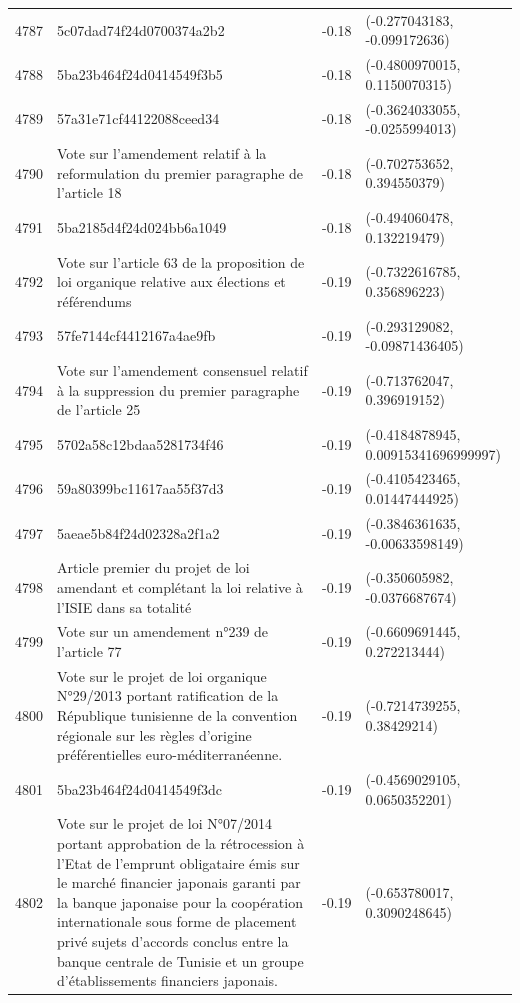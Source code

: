 \begin{table}[ht]
\begin{tabular}{rlrl}
  4787 & 5c07dad74f24d0700374a2b2 & -0.18 & (-0.277043183, -0.099172636) \\ 
  4788 & 5ba23b464f24d0414549f3b5 & -0.18 & (-0.4800970015, 0.1150070315) \\ 
  4789 & 57a31e71cf44122088ceed34 & -0.18 & (-0.3624033055, -0.0255994013) \\ 
  4790 & Vote sur l'amendement relatif à la reformulation du premier paragraphe de l'article 18 & -0.18 & (-0.702753652, 0.394550379) \\ 
  4791 & 5ba2185d4f24d024bb6a1049 & -0.18 & (-0.494060478, 0.132219479) \\ 
  4792 & Vote sur l'article 63 de la proposition de loi organique relative aux élections et référendums & -0.19 & (-0.7322616785, 0.356896223) \\ 
  4793 & 57fe7144cf4412167a4ae9fb & -0.19 & (-0.293129082, -0.09871436405) \\ 
  4794 & Vote sur l'amendement consensuel relatif à la suppression du premier paragraphe de l'article 25 & -0.19 & (-0.713762047, 0.396919152) \\ 
  4795 & 5702a58c12bdaa5281734f46 & -0.19 & (-0.4184878945, 0.00915341696999997) \\ 
  4796 & 59a80399bc11617aa55f37d3 & -0.19 & (-0.4105423465, 0.01447444925) \\ 
  4797 & 5aeae5b84f24d02328a2f1a2 & -0.19 & (-0.3846361635, -0.00633598149) \\ 
  4798 & Article premier du projet de loi amendant et complétant la loi relative à l'ISIE dans sa totalité & -0.19 & (-0.350605982, -0.0376687674) \\ 
  4799 & Vote sur un amendement n°239 de l'article 77 & -0.19 & (-0.6609691445, 0.272213444) \\ 
  4800 & Vote sur le projet de loi organique N°29/2013 portant ratification de la République tunisienne de la convention régionale sur les règles d'origine préférentielles euro-méditerranéenne. & -0.19 & (-0.7214739255, 0.38429214) \\ 
  4801 & 5ba23b464f24d0414549f3dc & -0.19 & (-0.4569029105, 0.0650352201) \\ 
  4802 & Vote sur le projet de loi N°07/2014 portant approbation de la rétrocession à l'Etat de l'emprunt obligataire émis sur le marché financier japonais garanti par la banque japonaise pour la coopération internationale sous forme de placement privé sujets d'accords conclus entre la banque centrale de Tunisie et un groupe d'établissements financiers japonais. & -0.19 & (-0.653780017, 0.3090248645) \\ 

\end{tabular}
\end{table}
